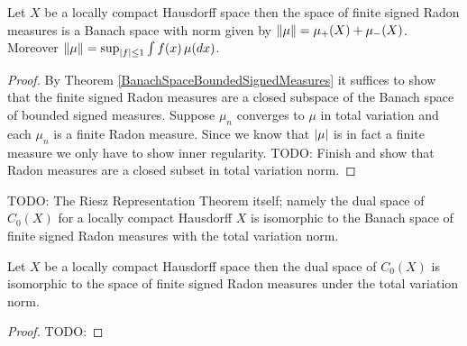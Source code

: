 \begin{thm}\label{BanachSpaceRadonMeasuresLCH}Let $X$ be a locally compact Hausdorff space then the space
  of finite signed Radon measures is a Banach space with norm given by
  $\lVert \mu \rVert = \mu_+(X) + \mu_-(X)$.  Moreover $\lVert \mu \rVert = \sup_{\left \vert f \right \vert \leq 1} \int f (x) \, \mu(dx)$.
\end{thm}
\begin{proof}
By Theorem \ref{BanachSpaceBoundedSignedMeasures} it suffices to show that the finite signed Radon measures are a closed subspace of the 
Banach space of bounded signed measures.
Suppose $\mu_n$ converges to $\mu$ in total variation and each $\mu_n$ is a finite Radon measure.  Since we know that $\left \vert \mu \right \vert$ is in fact a finite measure we only have to show inner regularity.
TODO: Finish and show that Radon measures are a closed subset in total variation norm.
\end{proof}

TODO: The Riesz Representation Theorem itself; namely the dual space of $C_0(X)$ for a locally compact Hausdorff $X$ is 
isomorphic to the Banach space of finite signed Radon measures with
the total variation norm.
\begin{thm}\label{RieszRepresentationLCH}Let $X$ be a locally compact
  Hausdorff space then the dual space of $C_0(X)$ is isomorphic to the
  space of finite signed Radon measures under the total variation norm.
\end{thm}
\begin{proof}
TODO:
\end{proof}

